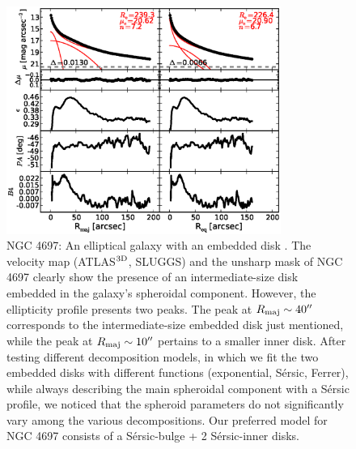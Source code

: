 \documentclass[preprint2]{emulateapj}
\newcommand{\fitfigurewidth}{0.8\textwidth}
\begin{document}
  \begin{figure}[h]
  \begin{center}
  \includegraphics[width=\fitfigurewidth]{images/n4697_1Dfit.eps}
  \caption{NGC 4697: 
  An elliptical galaxy with an embedded disk \citep{scorzabender1995}.
  The velocity map (ATLAS$^{\rm 3D}$, SLUGGS) and the unsharp mask of NGC 4697 clearly show 
  the presence of an intermediate-size disk embedded in the galaxy's spheroidal component.
  However, the ellipticity profile presents two peaks. 
  The peak at $R_{\rm maj} \sim 40''$ corresponds to the intermediate-size embedded disk just mentioned,
  while the peak at $R_{\rm maj} \sim 10''$ pertains to a smaller inner disk.
  After testing different decomposition models, 
  in which we fit the two embedded disks with different functions (exponential, S\'ersic, Ferrer),
  while always describing the main spheroidal component with a S\'ersic profile,
  we noticed that the spheroid parameters do not significantly vary among the various decompositions.
  Our preferred model for NGC 4697 consists of a S\'ersic-bulge + 2 S\'ersic-inner disks.
  }
  \end{center}
  \end{figure}
\end{document}
